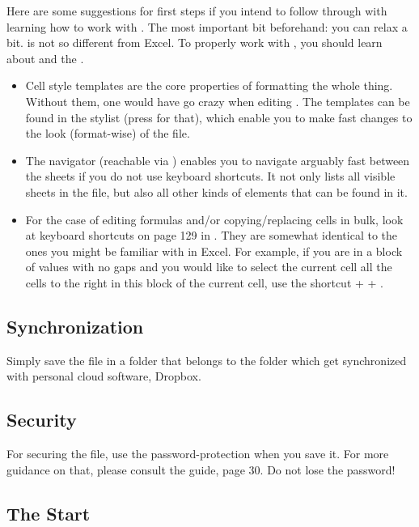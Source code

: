 Here are some suggestions for first steps if you intend to follow through with learning how to work with \loc.
The most important bit beforehand: you can relax a bit. \loc is not so different from Excel.
To properly work with \tfn, you should learn about  and the .
\begin{itemize}
	\item Cell style templates are the core properties of formatting the whole thing.
	Without them, one would have go crazy when editing \tfn.
	The templates can be found in the stylist (press  for that), which enable you to make fast changes to the look (format-wise) of the file.
	\item The navigator (reachable via ) enables you to navigate arguably fast between the sheets if you do not use keyboard shortcuts.
	It not only lists all visible sheets in the file, but also all other kinds of elements that can be found in it.
	\item For the case of editing formulas and/or copying/replacing cells in bulk, look at keyboard shortcuts on page 129 in .
	They are somewhat identical to the ones you might be familiar with in Excel.
	For example, if you are in a block of values with no gaps and you would like to select the current cell all the cells to the right in this block of the current cell, use the shortcut  +  + \keystroke{\( \rightarrow \)}.
\end{itemize}

\subsection{Synchronization}
\label{subsec:synchronization}

Simply save the file in a folder that belongs to the folder which get synchronized with personal cloud software, \eg Dropbox.

\subsection{Security}
\label{subsec:security}

For securing the file, use the password-protection when you save it.
For more guidance on that, please consult the  guide, page 30.
Do not lose the password!

\subsection{The Start}
\label{subsec:opening-the-file}

